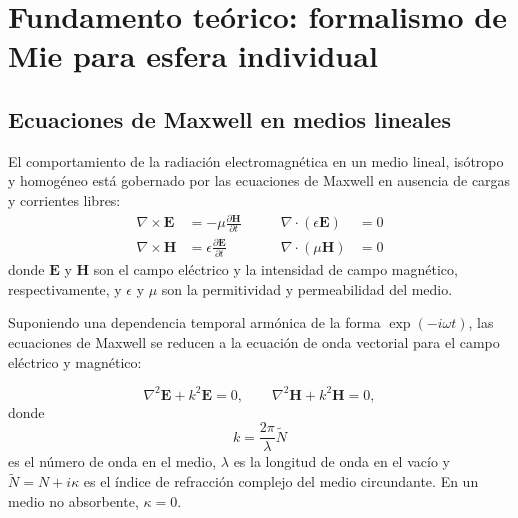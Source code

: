\section{Fundamento teórico: formalismo de Mie para esfera individual}
\label{sec:formalismo}
\subsection{Ecuaciones de Maxwell en medios lineales}

El comportamiento de la radiación electromagnética en un medio lineal, isótropo
y homogéneo está gobernado por las ecuaciones de Maxwell en ausencia de cargas y
corrientes libres:
\begin{equation}
\begin{aligned}
\nabla \times \mathbf{E} &= -\mu \frac{\partial \mathbf{H}}{\partial t}
&\qquad
\nabla \cdot (\epsilon \mathbf{E}) &= 0 \\
\nabla \times \mathbf{H} &=  \epsilon \frac{\partial \mathbf{E}}{\partial t}
&\qquad
\nabla \cdot (\mu \mathbf{H}) &= 0
\end{aligned}
\end{equation}
donde $\mathbf{E}$ y $\mathbf{H}$ son el campo eléctrico y la intensidad 
de campo magnético, respectivamente, y $\epsilon$ y $\mu$ son la 
permitividad y permeabilidad del medio.


Suponiendo una dependencia temporal armónica de la forma $\exp(-i\omega t)$,
las ecuaciones de Maxwell se reducen a la ecuación de onda vectorial para el
campo eléctrico y magnético:

\begin{equation}
  \label{eq:wave_equation}
  \nabla^2 \mathbf{E} + k^2 \mathbf{E} = 0,
  \qquad
  \nabla^2 \mathbf{H} + k^2 \mathbf{H} = 0,
\end{equation}
donde
\begin{equation}
k = \frac{2\pi}{\lambda}\tilde{N}
\end{equation}
es el número de onda en el medio, $\lambda$ es la longitud de onda en el vacío y $\tilde{N}
=N+i\kappa$ es el índice de refracción complejo del medio circundante. En un medio no
absorbente, $\kappa=0$.



